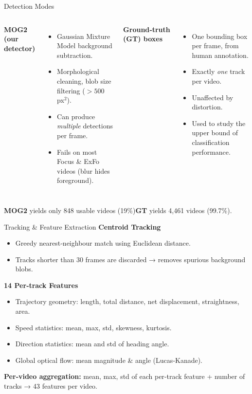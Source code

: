 \documentclass[compress,aspectratio=169]{beamer}
\begin{document}
\begin{frame}{Detection Modes}
  \begin{columns}[t]
    \textbf{MOG2 (our detector)}
    \begin{itemize}
      \item Gaussian Mixture Model background subtraction.
      \item Morphological cleaning, blob size filtering ($>500$ px$^2$).
      \item Can produce \emph{multiple} detections per frame.
      \item \alert{Fails on most Focus \& ExFo videos} (blur hides foreground).
    \end{itemize}
    \textbf{Ground‑truth (GT) boxes}
    \begin{itemize}
      \item One bounding box per frame, from human annotation.
      \item Exactly \emph{one} track per video.
      \item Unaffected by distortion.
      \item Used to study the \alert{upper bound} of classification performance.
    \end{itemize}
  \end{columns}
  \vspace{0.3cm}
  \small
  \textbf{MOG2} yields only 848 usable videos (19\%)\hspace{0.5cm}\textbf{GT} yields 4,461 videos (99.7\%).
\end{frame}

\begin{frame}{Tracking \& Feature Extraction}
  \textbf{Centroid Tracking}
  \begin{itemize}
    \item Greedy nearest‑neighbour match using Euclidean distance.
    \item Tracks shorter than 30 frames are discarded → removes spurious background blobs.
  \end{itemize}
  \vspace{0.1cm}
  \textbf{14 Per‑track Features}
  \begin{itemize}
    \item Trajectory geometry: length, total distance, net displacement, straightness, area.
    \item Speed statistics: mean, max, std, skewness, kurtosis.
    \item Direction statistics: mean and std of heading angle.
    \item Global optical flow: mean magnitude \& angle (Lucas‑Kanade).
  \end{itemize}
  \vspace{0.1cm}
  \textbf{Per‑video aggregation:} mean, max, std of each per‑track feature + number of tracks → \alert{43 features per video}.
\end{frame}
\end{document}
